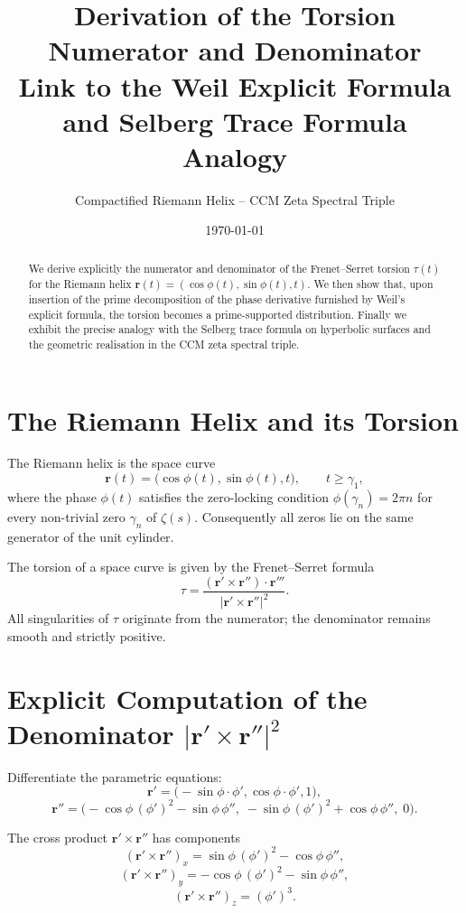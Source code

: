 \documentclass[11pt,a4paper]{article}
\title{\textbf{Derivation of the Torsion Numerator and Denominator}\\[0.3em]
\large Link to the Weil Explicit Formula and Selberg Trace Formula Analogy}
\author{Compactified Riemann Helix -- CCM Zeta Spectral Triple}
\date{\today}
\begin{document}
\maketitle

\begin{abstract}
We derive explicitly the numerator and denominator of the Frenet--Serret torsion \(\tau(t)\) for the Riemann helix \(\mathbf{r}(t)=(\cos\phi(t),\sin\phi(t),t)\). We then show that, upon insertion of the prime decomposition of the phase derivative furnished by Weil's explicit formula, the torsion becomes a prime-supported distribution. Finally we exhibit the precise analogy with the Selberg trace formula on hyperbolic surfaces and the geometric realisation in the CCM zeta spectral triple.
\end{abstract}

\section{The Riemann Helix and its Torsion}

The Riemann helix is the space curve
\[
\mathbf{r}(t)=\bigl(\cos\phi(t),\sin\phi(t),t\bigr),\qquad t\ge\gamma_1,
\]
where the phase \(\phi(t)\) satisfies the zero-locking condition \(\phi(\gamma_n)=2\pi n\) for every non-trivial zero \(\gamma_n\) of \(\zeta(s)\). Consequently all zeros lie on the same generator of the unit cylinder.

The torsion of a space curve is given by the Frenet--Serret formula
\[
\tau=\frac{(\mathbf{r}'\times\mathbf{r}'')\cdot\mathbf{r}'''}{|\mathbf{r}'\times\mathbf{r}''|^2}.
\]
All singularities of \(\tau\) originate from the numerator; the denominator remains smooth and strictly positive.

\section{Explicit Computation of the Denominator \(|\mathbf{r}'\times\mathbf{r}''|^2\)}

Differentiate the parametric equations:
\[
\mathbf{r}'=\bigl(-\sin\phi\cdot\phi',\cos\phi\cdot\phi',1\bigr),
\]
\[
\mathbf{r}''=\bigl(-\cos\phi\,(\phi')^2-\sin\phi\,\phi'',\;-\sin\phi\,(\phi')^2+\cos\phi\,\phi'',\;0\bigr).
\]

The cross product \(\mathbf{r}'\times\mathbf{r}''\) has components
\[
(\mathbf{r}'\times\mathbf{r}'')_x=\sin\phi\,(\phi')^2-\cos\phi\,\phi'',
\]
\[
(\mathbf{r}'\times\mathbf{r}'')_y=-\cos\phi\,(\phi')^2-\sin\phi\,\phi'',
\]
\[
(\mathbf{r}'\times\mathbf{r}'')_z=(\phi')^3.
\]
\end{document}
